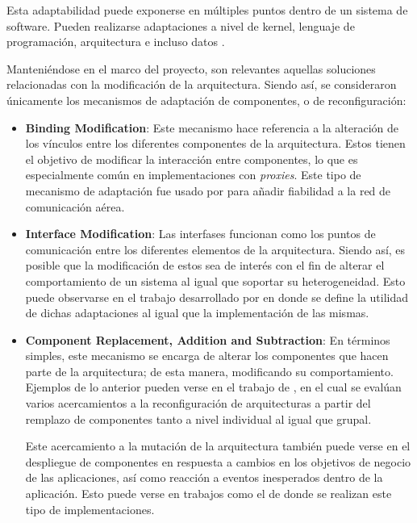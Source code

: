 Esta adaptabilidad puede exponerse en múltiples puntos dentro de un sistema de software. Pueden realizarse adaptaciones a nivel de kernel, lenguaje de programación, arquitectura e incluso datos \cite{lalanda_diaconescu_mccann_2014}. 

Manteniéndose en el marco del proyecto, son relevantes aquellas soluciones relacionadas con la modificación de la arquitectura. Siendo así, se consideraron únicamente los mecanismos de adaptación de componentes, o de reconfiguración:

\begin{itemize}
    \item \textbf{Binding Modification}: Este mecanismo hace referencia a la alteración de los vínculos entre los diferentes componentes de la arquitectura. Estos tienen el objetivo de modificar la interacción entre componentes, lo que es especialmente común en implementaciones con \textit{proxies}. Este tipo de mecanismo de adaptación fue usado por \citeauthor{Kabashkin_2017} \citeyear{Kabashkin_2017} para añadir fiabilidad a la red de comunicación aérea.

    \item \textbf{Interface Modification}: Las interfases funcionan como los puntos de comunicación entre los diferentes elementos de la arquitectura. Siendo así, es posible que la modificación de estos sea de interés con el fin de alterar el comportamiento de un sistema al igual que soportar su heterogeneidad. Esto puede observarse en el trabajo desarrollado por \citeauthor{Liu_2004} \citeyear{Liu_2004} en donde se define la utilidad de dichas adaptaciones al igual que la implementación de las mismas.

    \item \textbf{Component Replacement, Addition and Subtraction}: En términos simples, este mecanismo se encarga de alterar los componentes que hacen parte de la arquitectura; de esta manera, modificando su comportamiento. Ejemplos de lo anterior pueden verse en el trabajo de \citeauthor{Huynh_2019} \citeyear{Huynh_2019}, en el cual se evalúan varios acercamientos a la reconfiguración de arquitecturas a partir del remplazo de componentes tanto a nivel individual al igual que grupal. 
    
    Este acercamiento a la mutación de la arquitectura también puede verse en el despliegue de componentes en respuesta a cambios en los objetivos de negocio de las aplicaciones, así como reacción a eventos inesperados dentro de la aplicación. Esto puede verse en trabajos como el de \citeauthor{Patouni_2006} \citeyear{Patouni_2006} donde se realizan este tipo de implementaciones. 

\end{itemize}

